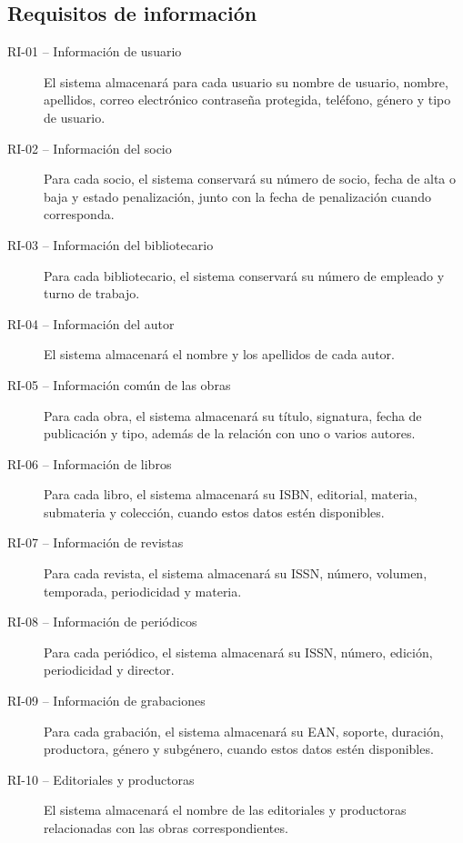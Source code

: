 \subsection{Requisitos de información}

\begin{description}
	\item[RI-01 -- Información de usuario]
	El sistema almacenará para cada usuario su nombre de usuario, nombre, apellidos, correo electrónico contraseña protegida, teléfono, género y tipo de usuario.
	
	\item[RI-02 -- Información del socio]
	Para cada socio, el sistema conservará su número de socio, fecha de alta o baja y estado  penalización, junto con la fecha de penalización cuando corresponda.
	
	\item[RI-03 -- Información del bibliotecario]
	Para cada bibliotecario, el sistema conservará su número de empleado y turno de trabajo.
	
	\item[RI-04 -- Información del autor]
	El sistema almacenará el nombre y los apellidos de cada autor.
	
	\item[RI-05 -- Información común de las obras]
	Para cada obra, el sistema almacenará su título, signatura, fecha de publicación y tipo, además de la relación con uno o varios autores.
	
	\item[RI-06 -- Información de libros]
	Para cada libro, el sistema almacenará su ISBN, editorial, materia, submateria y colección, cuando estos datos estén disponibles.
	
	\item[RI-07 -- Información de revistas]
	Para cada revista, el sistema almacenará su ISSN, número, volumen, temporada, periodicidad y materia.
	
	\item[RI-08 -- Información de periódicos]
	Para cada periódico, el sistema almacenará su ISSN, número, edición, periodicidad y director.
	
	\item[RI-09 -- Información de grabaciones]
	Para cada grabación, el sistema almacenará su EAN, soporte, duración, productora, género y subgénero, cuando estos datos estén disponibles.
	
	\item[RI-10 -- Editoriales y productoras]
	El sistema almacenará el nombre de las editoriales y productoras relacionadas con las obras correspondientes.
	

\end{description}
